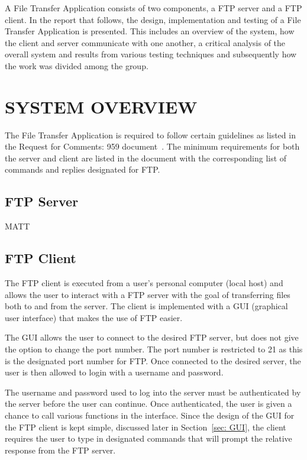 \documentclass[10pt,twocolumn]{witseiepaper}
\begin{document}
A File Transfer Application consists of two components, a FTP server and a FTP client. In the report that follows, the design, implementation and testing of a File Transfer Application is presented. This includes an overview of the system, how the client and server communicate with one another, a critical analysis of the overall system and results from various testing techniques and subsequently how the work was divided among the group.


%
\section{SYSTEM OVERVIEW}
\label{sec: System Overview}
The File Transfer Application is required to follow certain guidelines as listed in the Request for Comments: 959 document~\cite{RFC959}. The minimum requirements for both the server and client are listed in the document with the corresponding list of commands and replies designated for FTP.

\subsection{FTP Server}
\label{sec: FTP Server}
MATT

\subsection{FTP Client}
\label{sec: FTP Client}
The FTP client is executed from a user's personal computer (local host) and allows the user to interact with a FTP server with the goal of transferring files both to and from the server. The client is implemented with a GUI (graphical user interface) that makes the use of FTP easier.

The GUI allows the user to connect to the desired FTP server, but does not give the option to change the port number. The port number is restricted to 21 as this is the designated port number for FTP. Once connected to the desired server, the user is then allowed to login with a username and password.

The username and password used to log into the server must be authenticated by the server before the user can continue. Once authenticated, the user is given a chance to call various functions in the interface. Since the design of the GUI for the FTP client is kept simple, discussed later in Section~\ref{sec: GUI}, the client requires the user to type in designated commands that will prompt the relative response from the FTP server.
\end{document}
